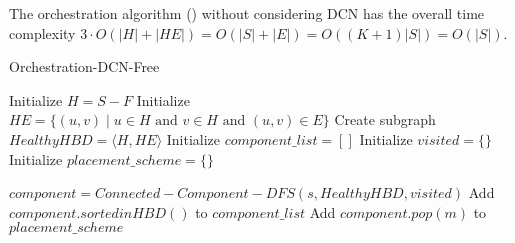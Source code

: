 The orchestration algorithm () without considering DCN has the overall time complexity $3\cdot O(|H| + |HE|) = O(|S| + |E|) = O((K+1)|S|) = O(|S|)$.



        

\begin{algorithm}[!h]
\small
\caption{Orchestration-DCN-Free}
\label{alg:orchestration-ideal}

 Initialize $H = S - F$\;
 Initialize $HE = \{ (u, v) \mid u \in H \text{ and } v \in H \text{ and } (u, v) \in E \}$\;
 Create subgraph $HealthyHBD = \langle H, HE \rangle$\;
 Initialize $component\_list = []$\;
 Initialize $visited = \{\}$\;
 Initialize $placement\_scheme= \{\}$\;

{
    {
         $component = Connected-Component-DFS(s, HealthyHBD, visited)$\;
         Add $component.sortedinHBD()$ to $component\_list$\;
    }
}
{
    {
         Add $component.pop(m)$ to $placement\_scheme$\;
    }
}
        
 \end{algorithm}
 

